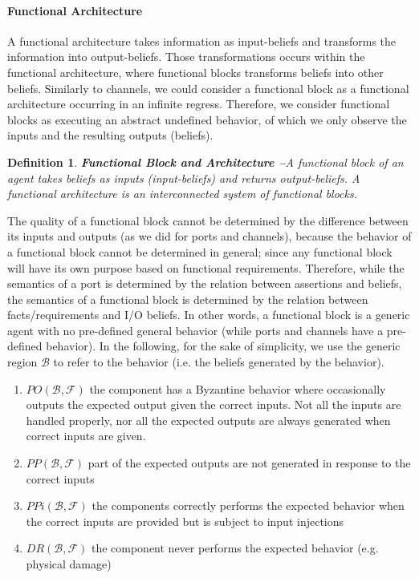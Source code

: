 \documentclass[conference]{IEEEtran}
\newcommand{\beliefRegion}{\mathcal{B}}
\newcommand{\factRegion}{\mathcal{F}}
\newcommand{\pp}[2]{PP(#1,#2)}
\newcommand{\po}[2]{PO(#1,#2)}
\newcommand{\ppi}[2]{PPi(#1,#2)}
\newcommand{\dr}[2]{DR(#1,#2)}
\newtheorem{definition}{Definition}%
\begin{document}
\paragraph{Functional Architecture}
A functional architecture takes information as input-beliefs and transforms the
information into output-beliefs. Those transformations occurs within the
functional architecture, where functional blocks transforms beliefs into other
beliefs. Similarly to channels, we could consider a functional block as a
functional architecture occurring in an infinite regress. Therefore, we
consider functional blocks as executing an abstract undefined behavior, of
which we only observe the inputs and the resulting outputs (beliefs).

\begin{definition}{\bf Functional Block and Architecture --}\label{def:funblock}
	A functional block of an agent takes beliefs as  inputs (input-beliefs) and
	returns output-beliefs.  A functional architecture is an
	interconnected system of functional blocks.
\end{definition}
The quality of a functional block cannot be determined
by the difference between its inputs and outputs (as we did for
ports and channels), because the behavior of a functional block
cannot be determined in general; since any functional block will have 
its own purpose based on functional requirements. 
Therefore, while the semantics of a port is determined by the relation 
between assertions and beliefs, the semantics of a functional block 
is determined by the relation between facts/requirements and I/O beliefs.
In other words, a functional block is a generic agent with no pre-defined general
behavior (while ports and channels have a pre-defined behavior).
In the following, for the sake of simplicity, 
we use the generic region $\beliefRegion$ to refer to the behavior (i.e.
the beliefs generated by the behavior).

\begin{enumerate}[start=50, label={W\arabic*)}]
	\item $\po{\beliefRegion}{\factRegion}$ the component has a Byzantine
		behavior where occasionally outputs the expected output given
		the correct inputs. Not all the inputs are handled properly,
		nor all the expected outputs are always generated when correct
		inputs are given.
	\item $\pp{\beliefRegion}{\factRegion}$ part of the expected outputs are not
	        generated in response to the correct
	        inputs
	\item $\ppi{\beliefRegion}{\factRegion}$ the components
	        correctly performs the expected behavior when the correct
	        inputs are provided but is subject to input
	        injections
	\item $\dr{\beliefRegion}{\factRegion}$ the component
		never performs the expected behavior (e.g. physical
		damage)
\end{enumerate}
\end{document}
